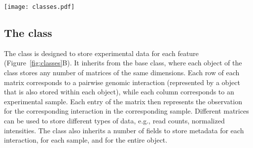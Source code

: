 \documentclass[10pt,a4paper,twocolumn]{article}
\begin{document}
\begin{figure*}
\centering
\texttt{[image: classes.pdf]}
\caption{Overview of the classes in the \textit{InteractionSet} package.
Relevant slots of each class (i.e., data values stored in each object of the class) are labelled with a preceding ``@''.
(A) The  class represents pairwise interactions between genomic regions by storing pairs of anchor indices that refer to coordinates in a  object.
(B) The  class stores experimental data in an ``assays'' matrix where each row is an interaction and each column is a sample.
(C) The  class represents the interaction space as a matrix, where each cell represents an interaction between the corresponding row/column regions.
}
\label{fig:classes}
\end{figure*}

\subsection*{The  class}
The  class is designed to store experimental data for each feature (Figure~\ref{fig:classes}B).
It inherits from the  base class, where each object of the class stores any number of matrices of the same dimensions.
Each row of each matrix corresponds to a pairwise genomic interaction (represented by a  object that is also stored within each  object), while each column corresponds to an experimental sample.
Each entry of the matrix then represents the observation for the corresponding interaction in the corresponding sample.
Different matrices can be used to store different types of data, e.g., read counts, normalized intensities.
The  class also inherits a number of fields to store metadata for each interaction, for each sample, and for the entire object.
\end{document}
